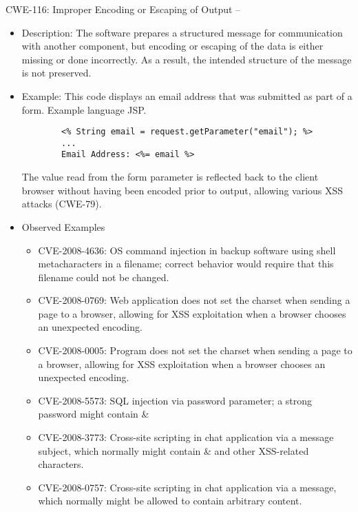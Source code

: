 \begin{example}{CWE-116: Improper Encoding or Escaping of Output\autocite{CWE-116} --}
	\begin{itemize} 
		\item Description: The software prepares a structured message
		for communication with another component, but encoding or
		escaping of the data is either missing or done incorrectly. As
		a result, the intended structure of the message is not
		preserved. 
		\item Example: This code displays an email
		address that was submitted as part of a form. Example language JSP.
		\begin{verbatim} 
		<% String email = request.getParameter("email"); %> 
		...
		Email Address: <%= email %>
		\end{verbatim}
		The value read from the form parameter is
		reflected back to the client browser without
		having been encoded prior to output, allowing
		various XSS attacks (CWE-79).
		\item Observed Examples
			\begin{itemize}
			\item CVE-2008-4636\autocite{CVE-2008-4636}: OS command injection in backup
				software using shell metacharacters in a
				filename; correct behavior would
				require that this filename could not be
				changed.
			\item CVE-2008-0769\autocite{CVE-2008-0769}: Web application does not set the
				charset when sending a page to a browser,
				allowing for XSS exploitation when a
				browser chooses an unexpected encoding.
			\item CVE-2008-0005\autocite{CVE-2008-0005}: Program does not set the charset
				when sending a page to a browser, allowing for
				XSS exploitation when a browser chooses
				an unexpected encoding.
			\item CVE-2008-5573\autocite{CVE-2008-5573}: SQL injection via password
				parameter; a strong password might contain \&
			\item CVE-2008-3773\autocite{CVE-2008-3773}: Cross-site scripting in chat
				application via a message subject, which
				normally might contain \& and other
				XSS-related characters.
			\item CVE-2008-0757\autocite{CVE-2008-0757}: Cross-site scripting in chat
				application via a message, which normally might
				be allowed to contain arbitrary
				content.
			\end{itemize}
\end{itemize}


\end{example}
